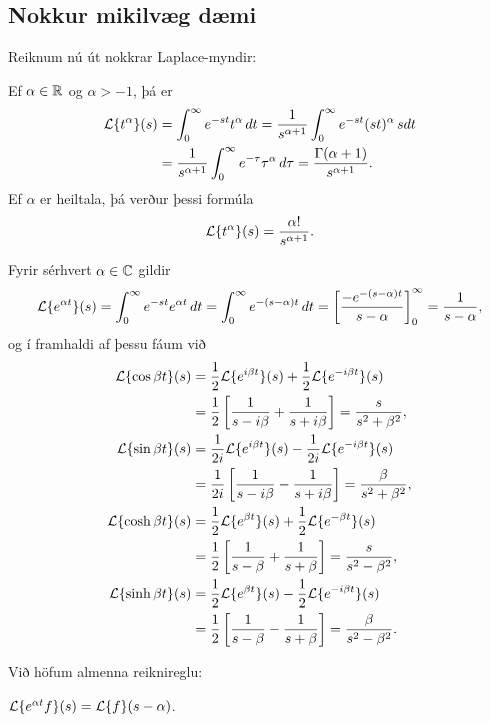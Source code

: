 \subsection*{Nokkur mikilvæg dæmi}


Reiknum nú út nokkrar Laplace-myndir:


Ef $\alpha\in {\mathbb R}$ og  $\alpha>-1$, þá er
\begin{align*}
{\cal L}{\{t^\alpha\}}(s)
&=\int_0^\infty e^{-st}t^\alpha \, dt =
\dfrac 1{s^{\alpha+1}} \int_0^\infty e^{-st}(st)^\alpha \, s dt \\
&=
\dfrac 1{s^{\alpha+1}} \int_0^\infty e^{-\tau}\tau^\alpha \,  d\tau =
\dfrac {\Gamma(\alpha+1)}{s^{\alpha+1}}.
\end{align*}
Ef ${\alpha}$ er heiltala, þá verður þessi formúla
$$
{\cal L}{\{t^\alpha\}}(s)
=\dfrac {\alpha!}{s^{\alpha+1}}.
 $$

\smallskip
Fyrir sérhvert $\alpha\in {\mathbb C}$ gildir
 $$
{\cal L}{\{e^{\alpha t}\}}(s)=
\int_0^{\infty}e^{-st}e^{\alpha t}\, dt =
\int_0^{\infty}e^{-(s-\alpha)t}\, dt =
\left[\dfrac {-e^{-(s-\alpha)t}} {s-\alpha}\right]_0^{\infty}=
\dfrac 1{s-\alpha},
 $$
og í framhaldi af þessu fáum við
\begin{align*}
{\cal L}{\{\cos\beta t\}}(s) &=
\frac 12 {\cal L}{\{e^{i\beta t}\}}(s) +\frac 12{\cal L}{\{e^{-i\beta t}\}}(s)\\
&=\frac 12\left[\dfrac 1{s-i\beta}+\dfrac 1{s+i\beta}\right]
=\dfrac s{s^2+\beta^2},\\
{\cal L}{\{\sin\beta t\}}(s) &=
\frac 1{2i}{\cal L}{\{e^{i\beta t}\}}(s) -\frac 1{2i}{\cal L}{\{e^{-i\beta t}\}}(s)\\
&=\frac 1{2i}\left[\dfrac 1{s-i\beta}-\dfrac 1{s+i\beta}\right]
=\dfrac {\beta}{s^2+\beta^2},\\
{\cal L}{\{\cosh \beta t\}}(s) &= 
\frac 12 {\cal L}{\{e^{\beta t}\}}(s) +\frac 12{\cal L}{\{e^{-\beta t}\}}(s)\\
&=\frac 12\left[\dfrac 1{s-\beta}+\dfrac 1{s+\beta}\right]
=\dfrac s{s^2-\beta^2},\\
{\cal L}{\{\sinh \beta t\}}(s) &= 
\frac 1{2}{\cal L}{\{e^{\beta t}\}}(s) -\frac 1{2}{\cal L}{\{e^{-i\beta t}\}}(s)\\
&=\frac 1{2}\left[\dfrac 1{s-\beta}-\dfrac 1{s+\beta}\right]
=\dfrac \beta{s^2-\beta^2}.
\end{align*}


Við höfum almenna reiknireglu:

\begin{se} ${\cal L}{\{e^{\alpha t}f\}}(s) = {\cal L}{\{f\}}(s-\alpha)$.
\end{se}

